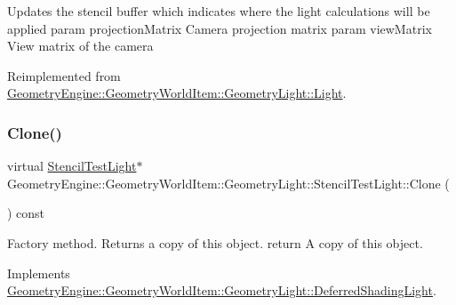 Updates the stencil buffer which indicates where the light calculations will be applied param projection\+Matrix Camera projection matrix param view\+Matrix View matrix of the camera 

Reimplemented from \mbox{\hyperlink{class_geometry_engine_1_1_geometry_world_item_1_1_geometry_light_1_1_light_ae50fab4782158671041ac986dfead7fc}{Geometry\+Engine\+::\+Geometry\+World\+Item\+::\+Geometry\+Light\+::\+Light}}.

\mbox{\label{class_geometry_engine_1_1_geometry_world_item_1_1_geometry_light_1_1_stencil_test_light_a6434a228dc64537ff9984c82eaf8ab07}} 
\subsubsection{\texorpdfstring{Clone()}{Clone()}}
{\footnotesize\ttfamily virtual \mbox{\hyperlink{class_geometry_engine_1_1_geometry_world_item_1_1_geometry_light_1_1_stencil_test_light}{Stencil\+Test\+Light}}$\ast$ Geometry\+Engine\+::\+Geometry\+World\+Item\+::\+Geometry\+Light\+::\+Stencil\+Test\+Light\+::\+Clone (\begin{DoxyParamCaption}{ }\end{DoxyParamCaption}) const\hspace{0.3cm}{\ttfamily [pure virtual]}}

Factory method. Returns a copy of this object. return A copy of this object. 

Implements \mbox{\hyperlink{class_geometry_engine_1_1_geometry_world_item_1_1_geometry_light_1_1_deferred_shading_light_a7ef4d7b7a41cbda01a55bcb0475484d3}{Geometry\+Engine\+::\+Geometry\+World\+Item\+::\+Geometry\+Light\+::\+Deferred\+Shading\+Light}}.



